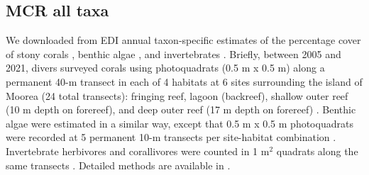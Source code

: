 \documentclass[11pt, oneside]{article}
\begin{document}
%
%
%
%
%

\subsection{MCR all taxa}
We downloaded from EDI annual taxon-specific estimates of the percentage cover of stony corals \citep{mcr-coral}, benthic algae \citep{mcr-algae}, and invertebrates \citep{mcr-inverts}. 
Briefly, between 2005 and 2021, divers surveyed corals using photoquadrats (0.5 m x 0.5 m) along a permanent 40-m transect in each of 4 habitats at 6 sites surrounding the island of Moorea (24 total transects): fringing reef, lagoon (backreef), shallow outer reef (10 m depth on forereef), and deep outer reef (17 m depth on forereef) \citep{mcr-coral}. 
Benthic algae were estimated in a similar way, except that 0.5 m x 0.5 m photoquadrats were recorded at 5 permanent 10-m transects per site-habitat combination \citep{mcr-algae}.
Invertebrate herbivores and corallivores were counted in 1 m$^2$ quadrats along the same transects \citep{mcr-inverts}. 
Detailed methods are available in \citet{mcr-coral, mcr-algae, mcr-inverts}.
\end{document}
